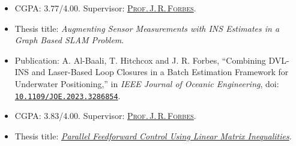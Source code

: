 \documentclass[10pt,letter]{altacv}
\begin{document}
\tagline{}


\begin{fullwidth}
\makecvheader
\end{fullwidth}


\begin{itemize}
\item CGPA: 3.77/4.00. Supervisor: \href{https://www.mcgill.ca/mecheng/james-forbes}{\textsc{Prof.\,J.\,R.\,Forbes}}.
\item Thesis title: \emph{Augmenting Sensor Measurements with INS Estimates in a Graph Based SLAM Problem}.
\item Publication: %
  {A. Al-Baali}, {T. Hitchcox} and {J. R. Forbes}, ``Combining DVL-INS and Laser-Based Loop Closures in a Batch Estimation Framework for Underwater Positioning,'' in \emph{IEEE Journal of Oceanic Engineering}, doi: \texttt{\href{http://doi.org/10.1109/JOE.2023.3286854}{10.1109/JOE.2023.3286854}}.
\end{itemize}

\divider

\begin{itemize}
\item CGPA: 3.83/4.00. Supervisor: \href{https://www.mcgill.ca/mecheng/james-forbes}{\textsc{Prof.\,J.\,R.\,Forbes}}.
\item Thesis title: \emph{\href{https://escholarship.mcgill.ca/concern/papers/9p290g61r}{Parallel Feedforward Control Using Linear Matrix Inequalities}}.
\end{itemize}
\end{document}
